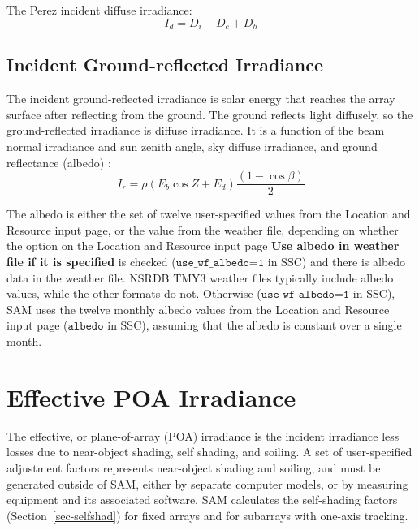\documentclass[12pt,letterpaper]{article}
\begin{document}
The Perez incident diffuse irradiance:
\begin{equation}
I_d = D_i + D_c + D_h
\end{equation}

\section{Incident Ground-reflected Irradiance}

The incident ground-reflected irradiance is solar energy that reaches the array surface after reflecting from the ground. The ground reflects light diffusely, so the ground-reflected irradiance is diffuse irradiance. It is a function of the beam normal irradiance and sun zenith angle, sky diffuse irradiance, and ground reflectance (albedo) \citep{liu1963}:
\begin{equation}
I_{r}= \mathit{\rho} \left( E_b \cos Z + E_d \right) \frac{( 1 - \cos\beta )}{2}
\end{equation}

The albedo is either the set of twelve user-specified values from the Location and Resource input page, or the value from the weather file, depending on whether the option on the Location and Resource input page \textbf{Use albedo in weather file if it is specified} is checked ($\texttt{use\_wf\_albedo=1}$ in SSC) and there is albedo data in the weather file. NSRDB TMY3 weather files typically include albedo values, while the other formats do not. Otherwise ($\texttt{use\_wf\_albedo=1}$ in SSC), SAM uses the twelve monthly albedo values from the Location and Resource input page ($\texttt{albedo}$ in SSC), assuming that the albedo is constant over a single month.

\chapter{Effective POA Irradiance}\label{sec-effectiveirradiance}

The effective, or plane-of-array (POA) irradiance is the incident irradiance less losses due to near-object shading, self shading, and soiling. A set of user-specified adjustment factors represents near-object shading and soiling, and must be generated outside of SAM, either by separate computer models, or by measuring equipment and its associated software. SAM calculates the self-shading factors (Section~\ref{sec-selfshad}) for fixed arrays and for subarrays with one-axis tracking.
\end{document}
